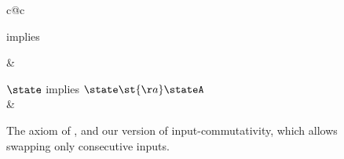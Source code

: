\begin{figure}[t]
\hrulefill
\begin{center}
  \begin{tabular}{c@{\hskip 20pt}c}
implies

& %

$ \state $ implies  $\state \st{ \aa } \stateA$
\\[5pt]
\restrictedinputcommutativity  &  
  \end{tabular}
\end{center}
\caption{The  axiom of \cite{DBLP:conf/concur/Selinger97},
  and our version of input-commutativity, which allows swapping only
  consecutive inputs.}
\label{fig:restricted-input-commutativity}
\hrulefill
\end{figure}





